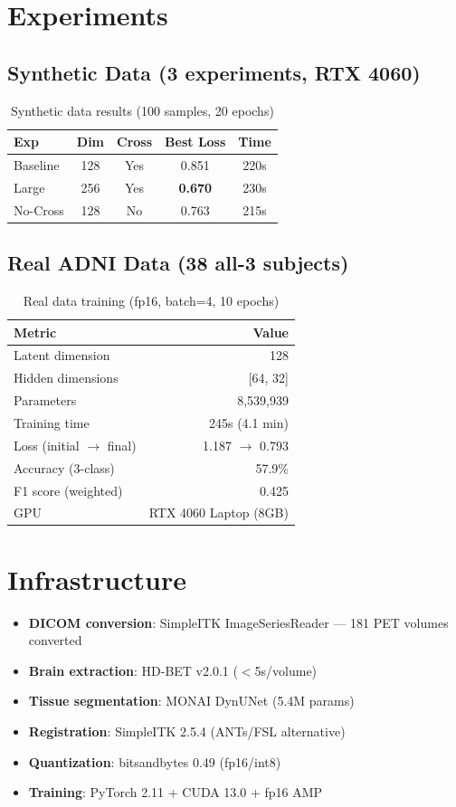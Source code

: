 \documentclass[11pt,a4paper]{article}
\begin{document}
\section{Experiments}

\subsection{Synthetic Data (3 experiments, RTX 4060)}
\begin{table}[H]
\centering
\caption{Synthetic data results (100 samples, 20 epochs)}
\begin{tabular}{lcccc}
\toprule
\textbf{Exp} & \textbf{Dim} & \textbf{Cross} & \textbf{Best Loss} & \textbf{Time} \\
\midrule
Baseline & 128 & Yes & 0.851 & 220s \\
Large    & 256 & Yes & \textbf{0.670} & 230s \\
No-Cross & 128 & No  & 0.763 & 215s \\
\bottomrule
\end{tabular}
\end{table}

\subsection{Real ADNI Data (38 all-3 subjects)}
\begin{table}[H]
\centering
\caption{Real data training (fp16, batch=4, 10 epochs)}
\begin{tabular}{lr}
\toprule
\textbf{Metric} & \textbf{Value} \\
\midrule
Latent dimension & 128 \\
Hidden dimensions & [64, 32] \\
Parameters & 8,539,939 \\
Training time & 245s (4.1 min) \\
Loss (initial $\rightarrow$ final) & 1.187 $\rightarrow$ 0.793 \\
Accuracy (3-class) & 57.9\% \\
F1 score (weighted) & 0.425 \\
GPU & RTX 4060 Laptop (8GB) \\
\bottomrule
\end{tabular}
\end{table}

\section{Infrastructure}
\begin{itemize}
\item \textbf{DICOM conversion}: SimpleITK ImageSeriesReader --- 181 PET volumes converted
\item \textbf{Brain extraction}: HD-BET v2.0.1 ($<$5s/volume)
\item \textbf{Tissue segmentation}: MONAI DynUNet (5.4M params)
\item \textbf{Registration}: SimpleITK 2.5.4 (ANTs/FSL alternative)
\item \textbf{Quantization}: bitsandbytes 0.49 (fp16/int8)
\item \textbf{Training}: PyTorch 2.11 + CUDA 13.0 + fp16 AMP
\end{itemize}
\end{document}
